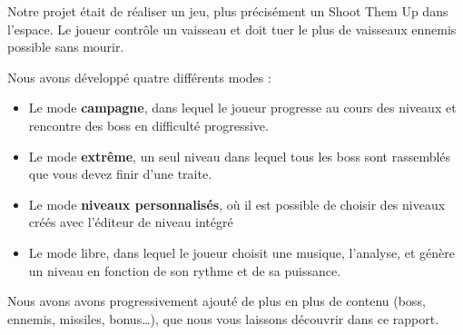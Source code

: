 \par Notre projet était de réaliser un jeu, plus précisément un Shoot Them Up dans l'espace.
Le joueur contrôle un vaisseau et doit tuer le plus de vaisseaux ennemis possible sans mourir.
\par Nous avons développé quatre différents modes :
\begin{itemize}
	\item Le mode \textbf{campagne}, dans lequel le joueur progresse au cours des niveaux et rencontre des boss en difficulté progressive.
	\item Le mode \textbf{extrême}, un seul niveau dans lequel tous les boss sont rassemblés que vous devez finir d'une traite.
	\item Le mode \textbf{niveaux personnalisés}, où il est possible de choisir des niveaux créés avec l'éditeur de niveau intégré
	\item Le mode libre, dans lequel le joueur choisit une musique, l'analyse, et génère un niveau en fonction de son rythme et de sa puissance.
\end{itemize}

\par Nous avons avons progressivement ajouté de plus en plus de contenu (boss, ennemis, missiles, bonus\ldots), que nous vous laissons découvrir dans ce rapport.
